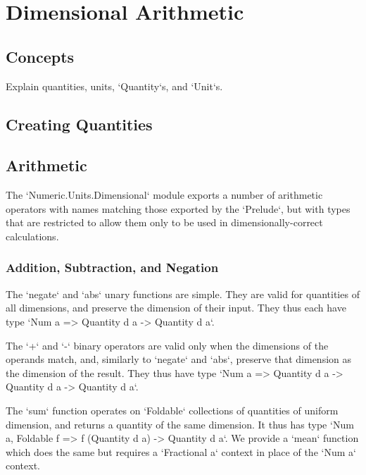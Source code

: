 \documentclass[11pt]{report}
\begin{document}




\chapter{Dimensional Arithmetic}

\section{Concepts}

Explain quantities, units, `Quantity`s, and `Unit`s.

\section{Creating Quantities}


\section{Arithmetic}

The `Numeric.Units.Dimensional` module exports a number of arithmetic operators with names matching those
exported by the `Prelude`, but with types that are restricted to allow them only to be used in dimensionally-correct
calculations.

\subsection{Addition, Subtraction, and Negation}

The `negate` and `abs` unary functions are simple. They are valid for quantities of all dimensions, and preserve the
dimension of their input. They thus each have type `Num a => Quantity d a -> Quantity d a`.

The `+` and `-` binary operators are valid only when the dimensions of the operands match, and,
similarly to `negate` and `abs`, preserve that dimension as the dimension of the result.
They thus have type `Num a => Quantity d a -> Quantity d a -> Quantity d a`.

The `sum` function operates on `Foldable` collections of quantities of uniform dimension, and returns a quantity of
the same dimension. It thus has type `Num a, Foldable f => f (Quantity d a) -> Quantity d a`. We provide a `mean` function
which does the same but requires a `Fractional a` context in place of the `Num a` context.
\end{document}
